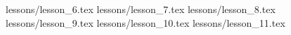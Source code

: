\documentclass[10pt,a4paper]{report}
\begin{document}
\tableofcontents


 {lessons/lesson_6.tex}
 {lessons/lesson_7.tex}
 {lessons/lesson_8.tex}
 {lessons/lesson_9.tex}
 {lessons/lesson_10.tex}
 {lessons/lesson_11.tex}
\end{document}

